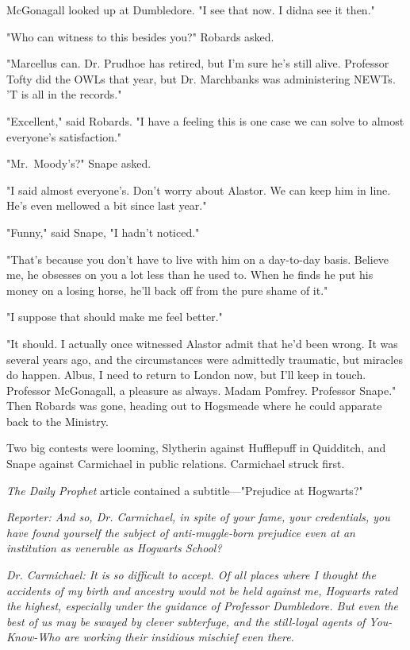 McGonagall looked up at Dumbledore. "I see that now. I didna see it then."

"Who can witness to this besides you?" Robards asked.

"Marcellus can. Dr. Prudhoe has retired, but I'm sure he's still alive. Professor Tofty did the OWLs that year, but Dr. Marchbanks was administering NEWTs. 'T is all in the records."

"Excellent," said Robards. "I have a feeling this is one case we can solve to almost everyone's satisfaction."

"Mr.~Moody's?" Snape asked.

"I said almost everyone's. Don't worry about Alastor. We can keep him in line. He's even mellowed a bit since last year."

"Funny," said Snape, "I hadn't noticed."

"That's because you don't have to live with him on a day-to-day basis. Believe me, he obsesses on you a lot less than he used to. When he finds he put his money on a losing horse, he'll back off from the pure shame of it."

"I suppose that should make me feel better."

"It should. I actually once witnessed Alastor admit that he'd been wrong. It was several years ago, and the circumstances were admittedly traumatic, but miracles do happen. Albus, I need to return to London now, but I'll keep in touch. Professor McGonagall, a pleasure as always. Madam Pomfrey. Professor Snape." Then Robards was gone, heading out to Hogsmeade where he could apparate back to the Ministry.

Two big contests were looming, Slytherin against Hufflepuff in Quidditch, and Snape against Carmichael in public relations. Carmichael struck first.

\emph{The Daily Prophet} article contained a subtitle—"Prejudice at Hogwarts?"

\emph{Reporter: And so, Dr. Carmichael, in spite of your fame, your credentials, you have found yourself the subject of anti-muggle-born prejudice even at an institution as venerable as Hogwarts School?}

\emph{Dr. Carmichael: It is so difficult to accept. Of all places where I thought the accidents of my birth and ancestry would not be held against me, Hogwarts rated the highest, especially under the guidance of Professor Dumbledore. But even the best of us may be swayed by clever subterfuge, and the still-loyal agents of You-Know-Who are working their insidious mischief even there.}

